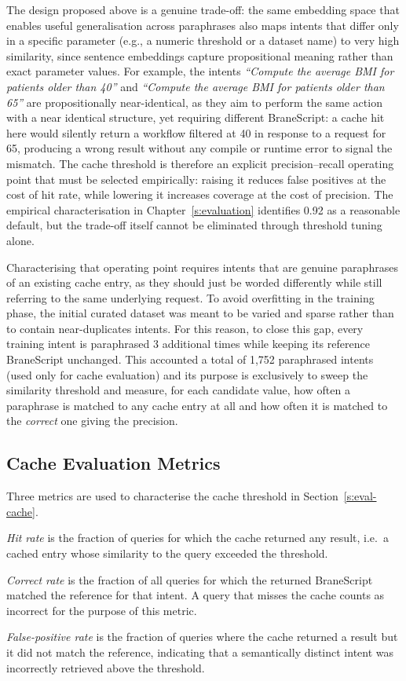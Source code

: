 The design proposed above is a genuine trade-off: the same embedding
space that enables useful generalisation across paraphrases also maps intents
that differ only in a specific parameter (e.g., a numeric threshold or a
dataset name) to very high similarity, since sentence embeddings capture
propositional meaning rather than exact parameter values. For example, the
intents \emph{``Compute the average BMI for patients older than 40''} and
\emph{``Compute the average BMI for patients older than 65''} are
propositionally near-identical, as they aim to perform the same action with a near identical
structure, yet requiring different BraneScript: a cache hit here would
silently return a workflow filtered at 40 in response to a request for 65,
producing a wrong result without any compile or runtime error to signal the
mismatch. The cache threshold
is therefore an explicit precision--recall operating point that must be
selected empirically: raising it reduces false positives at the cost of hit
rate, while lowering it increases coverage at the cost of precision. The
empirical characterisation in Chapter~\ref{s:evaluation} identifies 0.92 as
a reasonable default, but the trade-off itself cannot be eliminated through
threshold tuning alone.

Characterising that operating point requires intents that are genuine
paraphrases of an existing cache entry, as they should just be worded differently while still referring
to the same underlying request. To avoid overfitting in the training phase, 
the initial curated dataset was meant to be varied and sparse rather 
than to contain near-duplicates intents. 
For this reason, to close this gap, every training intent is paraphrased 3 additional times
while keeping its reference BraneScript unchanged. 
This accounted a total of 1,752  paraphrased intents (used only for cache evaluation) and its purpose is exclusively to sweep the
similarity threshold and measure, for each candidate value, how often a
paraphrase is matched to any cache entry at all and how often it is matched
to the \emph{correct} one giving the precision.

\subsection{Cache Evaluation Metrics}\label{s:cache-metrics}

Three metrics are used to characterise the cache threshold in
Section~\ref{s:eval-cache}.

\emph{Hit rate} is the fraction of queries for which the cache returned any
result, i.e.\ a cached entry whose similarity to the query exceeded the
threshold.

\emph{Correct rate} is the fraction of all queries for which the returned
BraneScript matched the reference for that intent. A query that misses the
cache counts as incorrect for the purpose of this metric.

\emph{False-positive rate} is the fraction of queries where the cache
returned a result but it did not match the reference, indicating that a
semantically distinct intent was incorrectly retrieved above the threshold.

